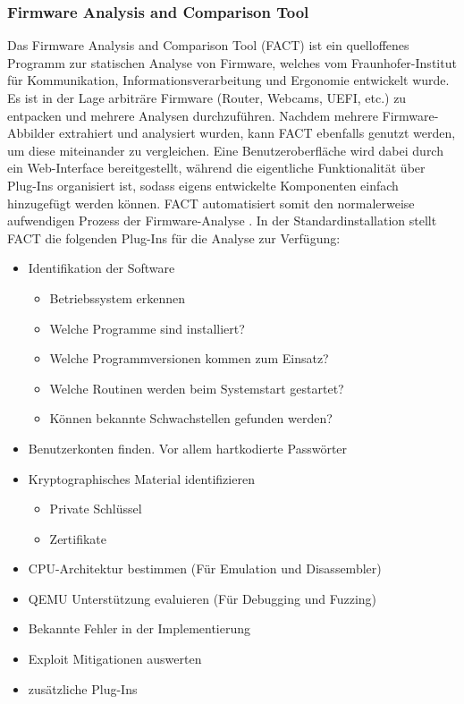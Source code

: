 \documentclass[a4paper]{book}
\begin{document}
\begin{large}
\subsubsection{Firmware Analysis and Comparison Tool}
\label{FACT}
\begin{onehalfspace}
Das \glqq Firmware Analysis and Comparison Tool\grqq{} (FACT) ist ein quelloffenes Programm zur statischen Analyse von Firmware, welches vom Fraunhofer-Institut für Kommunikation, Informationsverarbeitung und Ergonomie entwickelt wurde. Es ist in der Lage arbiträre Firmware (Router, Webcams, UEFI, etc.) zu entpacken und mehrere Analysen durchzuführen. Nachdem mehrere Firmware-Abbilder extrahiert und analysiert wurden, kann FACT ebenfalls genutzt werden, um diese miteinander zu vergleichen. Eine Benutzeroberfläche wird dabei durch ein Web-Interface bereitgestellt, während die eigentliche Funktionalität über Plug-Ins organisiert ist, sodass eigens entwickelte Komponenten einfach hinzugefügt werden können. FACT automatisiert somit den normalerweise aufwendigen Prozess der Firmware-Analyse \cite{FraunhoferFKIE.2020}. In der Standardinstallation stellt FACT die folgenden Plug-Ins für die Analyse zur Verfügung:
\end{onehalfspace}

\begin{itemize}
\setlength\itemsep{0.03em}
\item Identifikation der Software
\begin{itemize}
\item Betriebssystem erkennen
\item Welche Programme sind installiert?
\item Welche Programmversionen kommen zum Einsatz?
\item Welche Routinen werden beim Systemstart gestartet?
\item Können bekannte Schwachstellen gefunden werden?
\end{itemize}
\item Benutzerkonten finden. Vor allem hartkodierte Passwörter
\item Kryptographisches Material identifizieren
\begin{itemize}
\item Private Schlüssel
\item Zertifikate
\end{itemize}
\item CPU-Architektur bestimmen (Für Emulation und Disassembler)
\item QEMU Unterstützung evaluieren (Für Debugging und Fuzzing)
\item Bekannte Fehler in der Implementierung
\item Exploit Mitigationen auswerten
\item zusätzliche Plug-Ins
\end{itemize}
 



\end{large}
\end{document}
